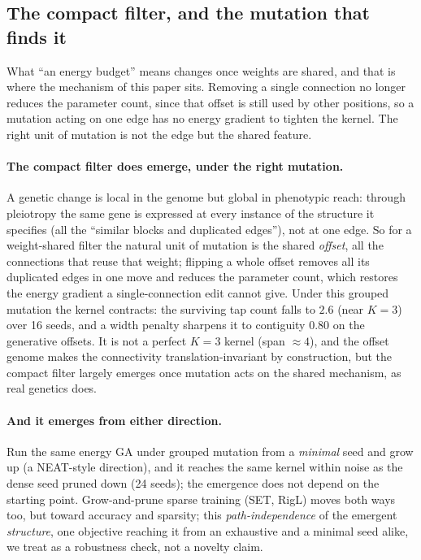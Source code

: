 \documentclass[11pt]{article}
\begin{document}
\subsection{The compact filter, and the mutation that finds it}

What ``an energy budget'' means changes once weights are shared, and that is where the mechanism of this
paper sits. Removing a single connection no longer reduces the parameter count, since that offset is still
used by other positions, so a mutation acting on one edge has no energy gradient to tighten the kernel. The
right unit of mutation is not the edge but the shared feature.

\paragraph{The compact filter does emerge, under the right mutation.} A genetic change is local in the
genome but global in phenotypic reach: through pleiotropy the same gene is expressed at every instance of
the structure it specifies (all the ``similar blocks and duplicated edges''), not at one edge. So for a weight-shared filter the natural unit of mutation is the
shared \emph{offset}, all the connections that reuse that weight; flipping a whole offset removes all its
duplicated edges in one move and reduces the parameter count, which restores the energy gradient a
single-connection edit cannot give. Under this grouped mutation the kernel contracts: the surviving tap
count falls to $2.6$ (near $K=3$) over 16 seeds, and a width penalty sharpens it to contiguity $0.80$ on
the generative offsets. It is not a perfect $K=3$ kernel (span $\approx 4$), and the offset genome makes
the connectivity translation-invariant by construction, but the compact filter largely emerges once
mutation acts on the shared mechanism, as real genetics does.

\paragraph{And it emerges from either direction.} Run the same energy GA under grouped mutation from a
\emph{minimal} seed and grow up (a NEAT-style direction), and it reaches the same kernel within noise as
the dense seed pruned down (24 seeds); the emergence does not depend on the starting point. Grow-and-prune
sparse training (SET, RigL) moves both ways too, but toward accuracy and sparsity; this
\emph{path-independence} of the emergent \emph{structure}, one objective reaching it from an exhaustive and
a minimal seed alike, we treat as a robustness check, not a novelty claim.
\end{document}
